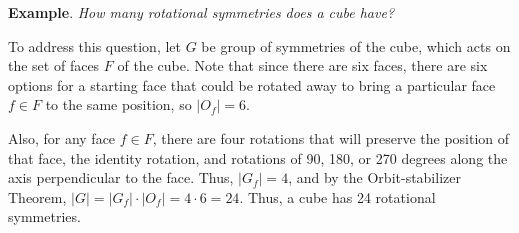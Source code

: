 \documentclass[ebook,12pt,oneside,openany]{article}
\begin{document}
	\textbf{Example}. \textit{How many rotational symmetries does a cube have?}
	
	To address this question, let $G$ be group of symmetries of the cube, which acts on the set of faces $F$ of the cube. Note that since there are six faces, there are six options for a starting face that could be rotated away to bring a particular face $f \in F$ to the same position, so $|O_f|=6$.
	
	Also, for any face $f \in F$, there are four rotations that will preserve the position of that face, the identity rotation, and rotations of 90, 180, or 270 degrees along the axis perpendicular to the face. Thus, $|G_f|=4$, and by the Orbit-stabilizer Theorem, $|G|=|G_f| \cdot |O_f|=4 \cdot 6 = 24$. Thus, a cube has 24 rotational symmetries.
	
\end{document}
